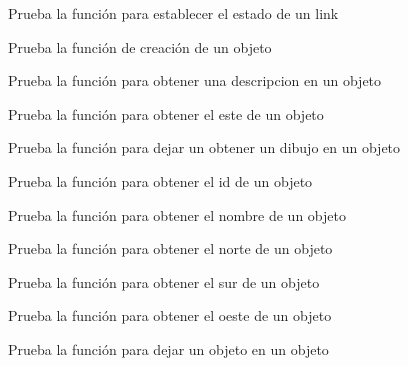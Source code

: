 \begin{DoxyRefList}
Prueba la función para establecer el estado de un link  
\item[\label{test__test000047}%
\Hypertarget{test__test000047}%
Member \hyperlink{object__test_8c_a3836d69f92ce7149d56bafcaec83f516}{test1\+\_\+object\+\_\+create} ()]Prueba la función de creación de un objeto  
\item[\label{test__test000082}%
\Hypertarget{test__test000082}%
Member \hyperlink{object__test_8c_afe180b78a201df7bc1629701db1d464c}{test1\+\_\+object\+\_\+get\+\_\+description} ()]Prueba la función para obtener una descripcion en un objeto  
\item[\label{test__test000068}%
\Hypertarget{test__test000068}%
Member \hyperlink{object__test_8c_add870347717b28f9627efc66ddb5a12b}{test1\+\_\+object\+\_\+get\+\_\+east} ()]Prueba la función para obtener el este de un objeto  
\item[\label{test__test000078}%
\Hypertarget{test__test000078}%
Member \hyperlink{object__test_8c_a43375c48c794bb6b2ed3fb8d949149b5}{test1\+\_\+object\+\_\+get\+\_\+gdesc} ()]Prueba la función para dejar un obtener un dibujo en un objeto  
\item[\label{test__test000072}%
\Hypertarget{test__test000072}%
Member \hyperlink{object__test_8c_aa88e9e9dab92ba9c58851d7a7a8415f0}{test1\+\_\+object\+\_\+get\+\_\+id} ()]Prueba la función para obtener el id de un objeto  
\item[\label{test__test000059}%
\Hypertarget{test__test000059}%
Member \hyperlink{object__test_8c_ad2411bc3cc47c9905e63a3d9c561d369}{test1\+\_\+object\+\_\+get\+\_\+name} ()]Prueba la función para obtener el nombre de un objeto  
\item[\label{test__test000064}%
\Hypertarget{test__test000064}%
Member \hyperlink{object__test_8c_acedfe61e854500c485598d66b7e5096c}{test1\+\_\+object\+\_\+get\+\_\+north} ()]Prueba la función para obtener el norte de un objeto  
\item[\label{test__test000066}%
\Hypertarget{test__test000066}%
Member \hyperlink{object__test_8c_a2e91b10e48cc9dc38285a3e358650e80}{test1\+\_\+object\+\_\+get\+\_\+south} ()]Prueba la función para obtener el sur de un objeto  
\item[\label{test__test000070}%
\Hypertarget{test__test000070}%
Member \hyperlink{object__test_8c_a8375fd84bcc6e4a2427cf4f6a77e102d}{test1\+\_\+object\+\_\+get\+\_\+west} ()]Prueba la función para obtener el oeste de un objeto  
\item[\label{test__test000074}%
\Hypertarget{test__test000074}%
Member \hyperlink{object__test_8c_a90c957b12175892a0dacc4e61f3c2ec2}{test1\+\_\+object\+\_\+leave\+\_\+object} ()]Prueba la función para dejar un objeto en un objeto  

\end{DoxyRefList}
